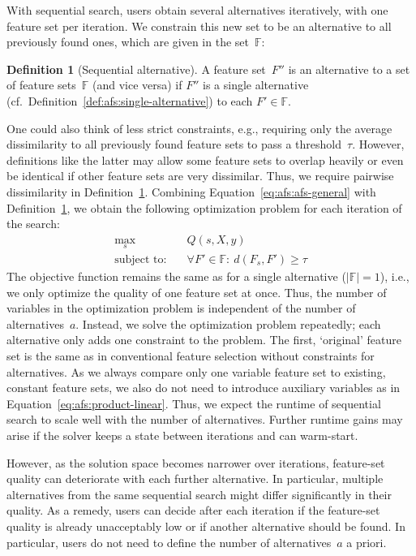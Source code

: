 \documentclass{article}
\theoremstyle{definition}
\newtheorem{definition}{Definition}
\begin{document}
With sequential search, users obtain several alternatives iteratively, with one feature set per iteration.
We constrain this new set to be an alternative to all previously found ones, which are given in the set~$\mathbb{F}$:
%
\begin{definition}[Sequential alternative]
	A feature set~$F''$ is an alternative to a set of feature sets~$\mathbb{F}$ (and vice versa) if $F''$ is a single alternative (cf.~Definition~\ref{def:afs:single-alternative}) to each $F' \in \mathbb{F}$.
	\label{def:afs:sequential-alternative}
\end{definition}
%
One could also think of less strict constraints, e.g., requiring only the average dissimilarity to all previously found feature sets to pass a threshold~$\tau$.
However, definitions like the latter may allow some feature sets to overlap heavily or even be identical if other feature sets are very dissimilar.
Thus, we require pairwise dissimilarity in Definition~\ref{def:afs:sequential-alternative}.
Combining Equation~\ref{eq:afs:afs-general} with Definition~\ref{def:afs:sequential-alternative}, we obtain the following optimization problem for each iteration of the search:
%
\begin{equation}
	\begin{aligned}
		\max_s &\quad Q(s,X,y) \\
		\text{subject to:} &\quad \forall F' \in \mathbb{F}:~d(F_s,F') \geq \tau
	\end{aligned}
	\label{eq:afs:afs-sequential}
\end{equation}
%
The objective function remains the same as for a single alternative ($|\mathbb{F}| = 1$), i.e., we only optimize the quality of one feature set at once.
Thus, the number of variables in the optimization problem is independent of the number of alternatives~$a$.
Instead, we solve the optimization problem repeatedly; each alternative only adds one constraint to the problem.
The first, `original' feature set is the same as in conventional feature selection without constraints for alternatives.
As we always compare only one variable feature set to existing, constant feature sets, we also do not need to introduce auxiliary variables as in Equation~\ref{eq:afs:product-linear}.
Thus, we expect the runtime of sequential search to scale well with the number of alternatives.
Further runtime gains may arise if the solver keeps a state between iterations and can warm-start.

However, as the solution space becomes narrower over iterations, feature-set quality can deteriorate with each further alternative.
In particular, multiple alternatives from the same sequential search might differ significantly in their quality.
As a remedy, users can decide after each iteration if the feature-set quality is already unacceptably low or if another alternative should be found.
In particular, users do not need to define the number of alternatives~$a$ a priori.
\end{document}

